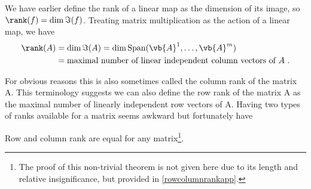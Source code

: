\documentclass[a4paper,12pt]{report}
\begin{document}
We have earlier define the rank of a linear map as the dimension of its image, so \(\rank (f) = \dim \Im(f)\). Treating matrix multiplication as the action of a linear map, we have 
\begin{equation}
    \begin{aligned}
        \rank (A) &= \dim \Im(A) = \dim \text{Span} (\vb{A} ^{1}, \ldots ,\vb{A} ^{m}  ) \\
        &= \text{maximal number of linear independent column vectors of \(A\) }.
    \end{aligned}
\end{equation}

For obvious reasons this is also sometimes called the column rank of the matrix A. This terminology suggests we can also define the row rank of the matrix A as the maximal number of linearly independent row vectors of A. Having two types of ranks available for a matrix seems awkward but fortunately have

\begin{theorem}\label{rowcolumnrank} 
Row and column rank are equal for any matrix\footnote{The proof of this non-trivial theorem is not given here due to its length and relative insignificance, but provided in \cref{rowcolumnrankapp}.}.
\end{theorem}
\end{document}
